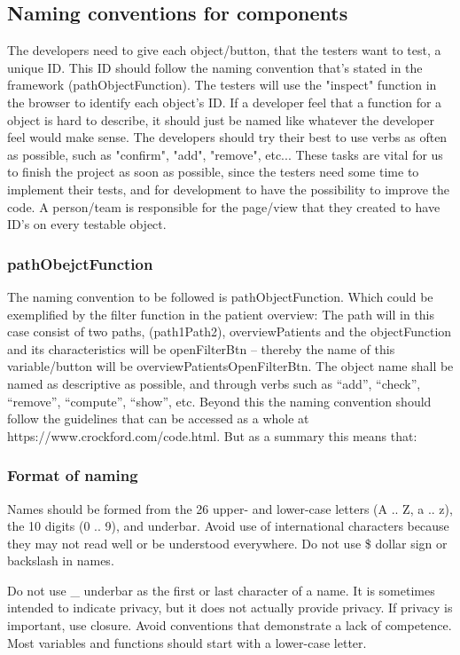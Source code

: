 \subsection{Naming conventions for components} \label{Naming convention}
The developers need to give each object/button, that the testers want to test, a unique ID. This ID should follow the naming convention that's stated in the framework (pathObjectFunction). The testers will use the "inspect" function in the browser to identify each object's ID. If a developer feel that a function for a object is hard to describe, it should just be named like whatever the developer feel would make sense. The developers should try their best to use verbs as often as possible, such as "confirm", "add", "remove", etc... These tasks are vital for us to finish the project as soon as possible, since the testers need some time to implement their tests, and for development to have the possibility to improve the code. A person/team is responsible for the page/view that they created to have ID's on every testable object.

\subsubsection{pathObejctFunction}
The naming convention to be followed is pathObjectFunction. Which could be exemplified by the filter function in the patient overview: The path will in this case consist of two paths, (path1Path2), overviewPatients and the objectFunction and its characteristics will be openFilterBtn – thereby the name of this variable/button will be overviewPatientsOpenFilterBtn. The object name shall be named as descriptive as possible, and through verbs such as “add”, “check”, “remove”, “compute”, “show”, etc. Beyond this the naming convention should follow the guidelines that can be accessed as a whole at https://www.crockford.com/code.html. But as a summary this means that: 

\subsubsection{Format of naming} Names should be formed from the 26 upper- and lower-case letters (A .. Z, a .. z), the 10 digits (0 .. 9), and underbar. Avoid use of international characters because they may not read well or be understood everywhere. Do not use \$ dollar sign or backslash in names. 

Do not use \_ underbar as the first or last character of a name. It is sometimes intended to indicate privacy, but it does not actually provide privacy. If privacy is important, use closure. Avoid conventions that demonstrate a lack of competence. Most variables and functions should start with a lower-case letter. 

